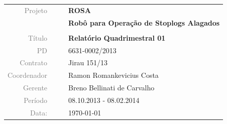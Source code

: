 \vspace{4cm}

\begin{table}[ht!]
	\centering
	\begin{tabular}{r l|l p{12cm} }
		\textcolor{gray}{Projeto} &&& \textbf{\Large ROSA}\\
			&&& \textbf{Robô para Operação de Stoplogs Alagados}\\
			&&& \\
		\textcolor{gray}{Título} &&& \textbf{Relatório Quadrimestral 01}\\
		\textcolor{gray}{PD} &&& 6631-0002/2013 \\
		\textcolor{gray}{Contrato} &&& Jirau 151/13\\
		\textcolor{gray}{Coordenador} &&& Ramon Romankevicius Costa \\
		\textcolor{gray}{Gerente} &&& Breno Bellinati de Carvalho \\
		\textcolor{gray}{Período} &&& 08.10.2013 - 08.02.2014 \\
		\textcolor{gray}{Data:} &&& \today \\
	\end{tabular}
\end{table}


\cleardoublepage


\thispagestyle{empty}


